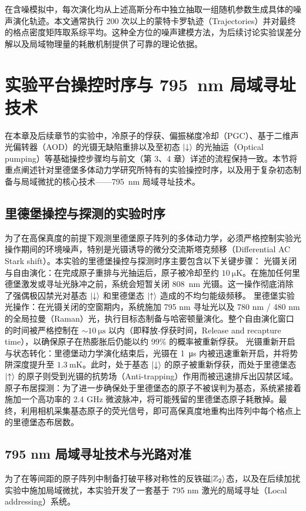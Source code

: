 \documentclass[../main.tex]{subfiles}
\begin{document}
在含噪模拟中，每次演化均从上述高斯分布中独立抽取一组随机参数生成具体的噪声演化轨迹。本文通常执行 200 次以上的蒙特卡罗轨迹（Trajectories）并对最终的格点密度矩阵取系综平均。这种全方位的噪声建模方法，为后续讨论实验误差分解以及局域物理量的耗散机制提供了可靠的理论依据。

\section{实验平台操控时序与 \SI{795}{\nm} 局域寻址技术}

在本章及后续章节的实验中，冷原子的俘获、偏振梯度冷却（PGC）、基于二维声光偏转器（AOD）的光镊无缺陷重排以及至初态 $\ket{\downarrow}$ 的光抽运（Optical pumping）等基础操控步骤均与前文（第 3、4 章）详述的流程保持一致。本节将重点阐述针对里德堡多体动力学研究所特有的实验操控时序，以及用于复杂初态制备与局域微扰的核心技术——\SI{795}{\nm} 局域寻址技术。

\subsection{里德堡操控与探测的实验时序}
为了在高保真度的前提下观测里德堡原子阵列的多体动力学，必须严格控制实验光操作期间的环境噪声，特别是光镊诱导的微分交流斯塔克频移（Differential AC Stark shift）。本实验的里德堡操控与探测时序主要包含以下关键步骤：
光镊关闭与自由演化：在完成原子重排与光抽运后，原子被冷却至约 $\SI{10}{\micro\kelvin}$。在施加任何里德堡激发或寻址光脉冲之前，系统会短暂关闭 \SI{808}{\nm} 光镊。这一操作彻底消除了强偶极囚禁光对基态 $\ket{\downarrow}$ 和里德堡态 $\ket{\uparrow}$ 造成的不均匀能级频移。
里德堡实验光操作：在光镊关闭的空窗期内，系统施加 795 nm 寻址光以及 780 nm / 480 nm 的全局拉曼（Raman）光，执行目标态制备与哈密顿量演化。整个自由演化窗口的时间被严格控制在 $\sim\SI{10}{\micro\second}$ 以内（即释放-俘获时间，Release and recapture time），以确保原子在热膨胀后仍能以约 99\% 的概率被重新俘获。
光镊重新开启与状态转化：里德堡动力学演化结束后，光镊在 \SI{1}{\us} 内被迅速重新开启，并将势阱深度提升至 $\SI{1.3}{\milli\kelvin}$。此时，处于基态 $\ket{\downarrow}$ 的原子被重新俘获，而处于里德堡态 $\ket{\uparrow}$ 的原子则受到光镊的抗势场（Anti-trapping）作用而被迅速排斥出囚禁区域。
原子布居探测：为了进一步确保处于里德堡态的原子不被误判为基态，系统紧接着施加一个高功率的 2.4 GHz 微波脉冲，将可能残留的里德堡态原子耗散掉。最终，利用相机采集基态原子的荧光信号，即可高保真度地重构出阵列中每个格点上的里德堡态布居数。

\subsection{795 nm 局域寻址技术与光路对准}
为了在等间距的原子阵列中制备打破平移对称性的反铁磁$\ket{\mathbb{Z}_2}$态，以及在后续加扰实验中施加局域微扰，本实验开发了一套基于 795 nm 激光的局域寻址（Local addressing）系统。
\end{document}
